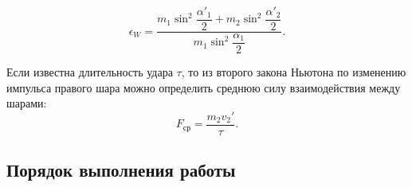 \documentclass[a4paper, 12pt]{extarticle}
\newcommand{\eps}{\epsilon}
\begin{document}
\begin{equation}
\label{eq:m12-eps_W-2}
\eps_W = \frac{m_1 \sin^2 \dfrac{\alpha'_1}{2} + m_2 \sin^2 \dfrac{\alpha'_2}{2}}{m_1 \sin^2 \dfrac{\alpha_1}{2}}.
\end{equation}

Если известна длительность удара $\tau$, то из второго закона Ньютона по изменению импульса правого шара можно определить среднюю силу взаимодействия между шарами: %
\begin{equation}
\label{eq:m12-2nd-newton's-law}
F_\text{ср} = \frac{m_2 v_2'}{\tau}. %
\end{equation}

\subsection{Порядок выполнения работы}
\end{document}
